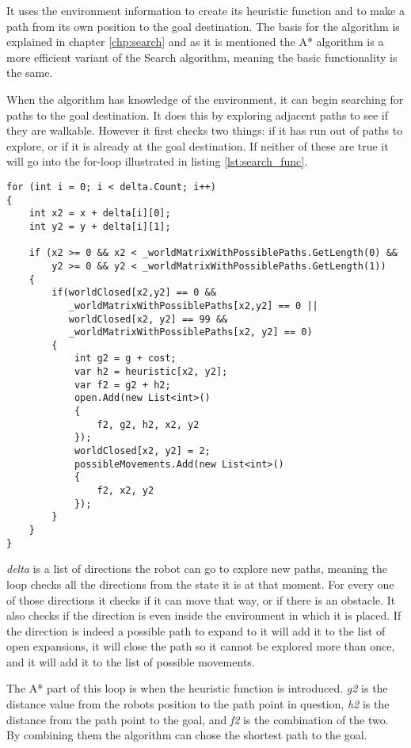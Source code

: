 It uses the environment information to create its heuristic function and to make a path from its own position to the goal destination. The basis for the algorithm is explained in chapter \ref{chp:search} and as it is mentioned the A* algorithm is a more efficient variant of the Search algorithm, meaning the basic functionality is the same. 

When the algorithm has knowledge of the environment, it can begin searching for paths to the goal destination. It does this by exploring adjacent paths to see if they are walkable. However it first checks two things: if it has run out of paths to explore, or if it is already at the goal destination. If neither of these are true it will go into the for-loop illustrated in listing \ref{lst:search_func}. 

\lstset{style=sharpc}
\begin{lstlisting}[caption={Functionality of Search}, label=lst:search_func, mathescape=true]             
for (int i = 0; i < delta.Count; i++)
{
	int x2 = x + delta[i][0];
	int y2 = y + delta[i][1];

	if (x2 >= 0 && x2 < _worldMatrixWithPossiblePaths.GetLength(0) && 
	    y2 >= 0 && y2 < _worldMatrixWithPossiblePaths.GetLength(1))
	{
		if(worldClosed[x2,y2] == 0 && 
		   _worldMatrixWithPossiblePaths[x2,y2] == 0 || 
		   worldClosed[x2, y2] == 99 && 
		   _worldMatrixWithPossiblePaths[x2, y2] == 0)
		{
			int g2 = g + cost;
			var h2 = heuristic[x2, y2];
			var f2 = g2 + h2;
			open.Add(new List<int>()
			{
				f2, g2, h2, x2, y2
			});
			worldClosed[x2, y2] = 2;
			possibleMovements.Add(new List<int>()
			{
				f2, x2, y2
			});
		}
	}
}
\end{lstlisting}

\emph{delta} is a list of directions the robot can go to explore new paths, meaning the loop checks all the directions from the state it is at that moment. For every one of those directions it checks if it can move that way, or if there is an obstacle. It also checks if the direction is even inside the environment in which it is placed. If the direction is indeed a possible path to expand to it will add it to the list of open expansions, it will close the path so it cannot be explored more than once, and it will add it to the list of possible movements.

The A* part of this loop is when the heuristic function is introduced. \emph{g2} is the distance value from the robots position to the path point in question, \emph{h2} is the distance from the path point to the goal, and \emph{f2} is the combination of the two. By combining them the algorithm can chose the shortest path to the goal.

